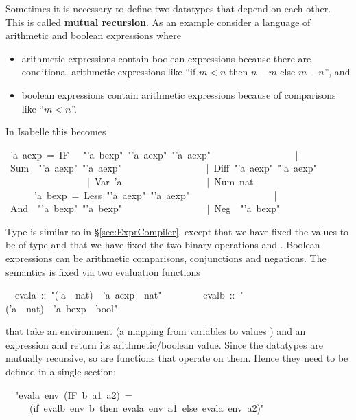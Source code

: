 \begin{isabelle}%
%
\begin{isamarkuptext}%
Sometimes it is necessary to define two datatypes that depend on each
other. This is called \textbf{mutual recursion}. As an example consider a
language of arithmetic and boolean expressions where
\begin{itemize}
\item arithmetic expressions contain boolean expressions because there are
  conditional arithmetic expressions like ``if $m<n$ then $n-m$ else $m-n$'',
  and
\item boolean expressions contain arithmetic expressions because of
  comparisons like ``$m<n$''.
\end{itemize}
In Isabelle this becomes%
\end{isamarkuptext}%
~'a~aexp~=~IF~~~{"}'a~bexp{"}~{"}'a~aexp{"}~{"}'a~aexp{"}\isanewline
~~~~~~~~~~~~~~~~~|~Sum~~{"}'a~aexp{"}~{"}'a~aexp{"}\isanewline
~~~~~~~~~~~~~~~~~|~Diff~{"}'a~aexp{"}~{"}'a~aexp{"}\isanewline
~~~~~~~~~~~~~~~~~|~Var~'a\isanewline
~~~~~~~~~~~~~~~~~|~Num~nat\isanewline
{}~~~~~~'a~bexp~=~Less~{"}'a~aexp{"}~{"}'a~aexp{"}\isanewline
~~~~~~~~~~~~~~~~~|~And~~{"}'a~bexp{"}~{"}'a~bexp{"}\isanewline
~~~~~~~~~~~~~~~~~|~Neg~~{"}'a~bexp{"}%
\begin{isamarkuptext}%
\noindent
Type  is similar to  in \S\ref{sec:ExprCompiler},
except that we have fixed the values to be of type  and that we
have fixed the two binary operations  and . Boolean
expressions can be arithmetic comparisons, conjunctions and negations.
The semantics is fixed via two evaluation functions%
\end{isamarkuptext}%
~~evala~::~{"}('a~{\isasymRightarrow}~nat)~{\isasymRightarrow}~'a~aexp~{\isasymRightarrow}~nat{"}\isanewline
~~~~~~~~evalb~::~{"}('a~{\isasymRightarrow}~nat)~{\isasymRightarrow}~'a~bexp~{\isasymRightarrow}~bool{"}%
\begin{isamarkuptext}%
\noindent
that take an environment (a mapping from variables  to values
) and an expression and return its arithmetic/boolean
value. Since the datatypes are mutually recursive, so are functions that
operate on them. Hence they need to be defined in a single 
section:%
\end{isamarkuptext}%
\isanewline
~~{"}evala~env~(IF~b~a1~a2)~=\isanewline
~~~~~(if~evalb~env~b~then~evala~env~a1~else~evala~env~a2){"}\isanewline

\end{isabelle}
